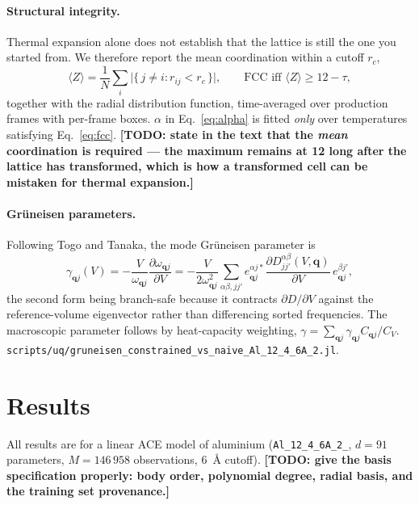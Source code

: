 \documentclass{article}
\newcommand{\TODO}[1]{{\color{blue}\textbf{[TODO: #1]}}}
\newcommand{\code}[1]{\texttt{\small #1}}
\begin{document}
\paragraph{Structural integrity.} Thermal expansion alone does not establish that
the lattice is still the one you started from. We therefore report the mean
coordination within a cutoff $r_c$,
\begin{equation}
  \langle Z\rangle = \frac{1}{N}\sum_i \bigl|\{\,j\ne i : r_{ij} < r_c\,\}\bigr|,
  \qquad \text{FCC iff } \langle Z\rangle \ge 12-\tau ,
  \label{eq:fcc}
\end{equation}
together with the radial distribution function, time-averaged over production
frames with per-frame boxes. $\alpha$ in Eq.~\eqref{eq:alpha} is fitted
\emph{only} over temperatures satisfying Eq.~\eqref{eq:fcc}.
\TODO{state in the text that the \emph{mean} coordination is required --- the
maximum remains at 12 long after the lattice has transformed, which is how a
transformed cell can be mistaken for thermal expansion.}

\paragraph{Gr\"uneisen parameters.} Following Togo and Tanaka, the mode
Gr\"uneisen parameter is
\begin{equation}
  \gamma_{\bm qj}(V)
  = -\frac{V}{\omega_{\bm qj}}\frac{\partial\omega_{\bm qj}}{\partial V}
  = -\frac{V}{2\omega_{\bm qj}^{2}}
    \sum_{\alpha\beta,jj'} e^{\alpha j*}_{\bm qj}
    \frac{\partial D^{\alpha\beta}_{jj'}(V,\bm q)}{\partial V}\, e^{\beta j'}_{\bm qj},
  \label{eq:gruneisen}
\end{equation}
the second form being branch-safe because it contracts $\partial D/\partial V$
against the reference-volume eigenvector rather than differencing sorted
frequencies. The macroscopic parameter follows by heat-capacity weighting,
$\gamma = \sum_{\bm qj}\gamma_{\bm qj}C_{\bm qj}/C_V$.
\code{scripts/uq/gruneisen\_constrained\_vs\_naive\_Al\_12\_4\_6A\_2.jl}.

\section{Results}

All results are for a linear ACE model of aluminium (\code{Al\_12\_4\_6A\_2\_},
$d=91$ parameters, $M=146\,958$ observations, $6$~\AA{} cutoff).
\TODO{give the basis specification properly: body order, polynomial degree,
radial basis, and the training set provenance.}
\end{document}
